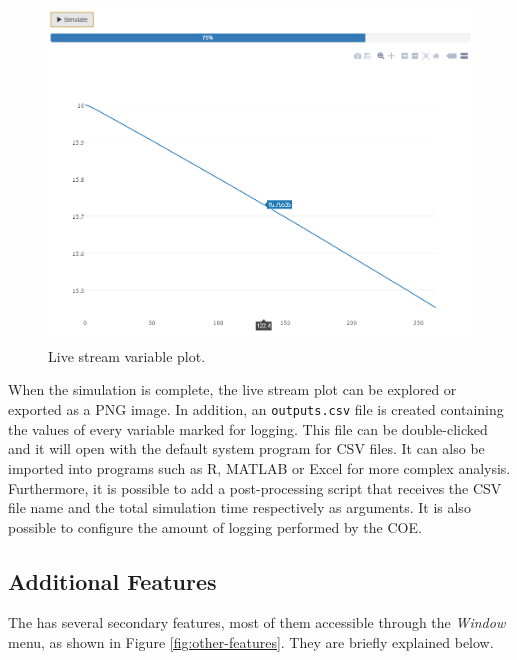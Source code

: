 \begin{figure}[ht]
\centering
\includegraphics[width=\textwidth]{./figures/app/cosim-plot}
\caption{Live stream variable plot.}
\label{fig:cosim-plot}
\end{figure}
%
%
%
When the simulation is complete, the live stream plot can be explored or
exported as a PNG image. In addition, an \texttt{outputs.csv} file is created
containing the values of every variable marked for logging. This file can be double-clicked and it will open with the
default system program for CSV files. It can also be imported into programs such as R, MATLAB or Excel for more complex analysis. Furthermore, it is possible to add a post-processing script that receives the CSV file name and the total simulation time respectively as arguments. It is also possible to configure the amount of logging performed by the COE.
%
%
%
%
%
%
%
%
%
\subsection{Additional Features}
\label{sub:other-features}

The \intoapp{} has several secondary features, most of them accessible through
the \textit{Window} menu, as shown in Figure \ref{fig:other-features}. They
are briefly explained below.

